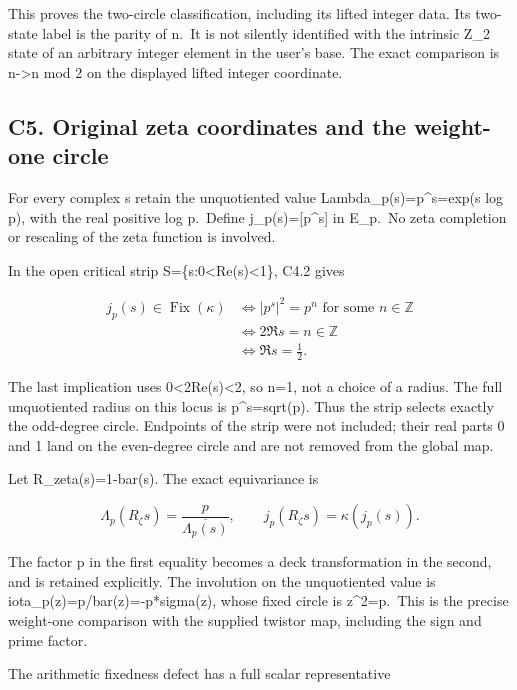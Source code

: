 \documentclass[
]{article}
\begin{document}
This proves the two-circle classification, including its lifted integer
data. Its two-state label is the parity of n.~It is not silently
identified with the intrinsic Z\_2 state of an arbitrary integer element
in the user's base. The exact comparison is n-\textgreater n mod 2 on
the displayed lifted integer coordinate.

\subsection{C5. Original zeta coordinates and the weight-one
circle}\label{c5.-original-zeta-coordinates-and-the-weight-one-circle}

For every complex s retain the unquotiented value
Lambda\_p(s)=p\^{}s=exp(s log p), with the real positive log p.~Define
j\_p(s)={[}p\^{}s{]} in E\_p.~No zeta completion or rescaling of the
zeta function is involved.

In the open critical strip S=\{s:0\textless Re(s)\textless1\}, C4.2
gives

\[
\begin{aligned}
j_p(s)\in\operatorname{Fix}(\kappa)
&\Longleftrightarrow |p^s|^2=p^n\text{ for some }n\in\mathbb Z\\
&\Longleftrightarrow 2\Re s=n\in\mathbb Z\\
&\Longleftrightarrow \Re s=\tfrac12.
\end{aligned}
\tag{C5.1}
\]

The last implication uses 0\textless2Re(s)\textless2, so n=1, not a
choice of a radius. The full unquotiented radius on this locus is
\textbar p\^{}s\textbar=sqrt(p). Thus the strip selects exactly the
odd-degree circle. Endpoints of the strip were not included; their real
parts 0 and 1 land on the even-degree circle and are not removed from
the global map.

Let R\_zeta(s)=1-bar(s). The exact equivariance is

\[
\Lambda_p(R_\zeta s)=\frac p{\overline{\Lambda_p(s)}},\qquad
j_p(R_\zeta s)=\kappa(j_p(s)).
\tag{C5.2}
\]

The factor p in the first equality becomes a deck transformation in the
second, and is retained explicitly. The involution on the unquotiented
value is iota\_p(z)=p/bar(z)=-p*sigma(z), whose fixed circle is
\textbar z\textbar\^{}2=p.~This is the precise weight-one comparison
with the supplied twistor map, including the sign and prime factor.

The arithmetic fixedness defect has a full scalar representative
\end{document}
